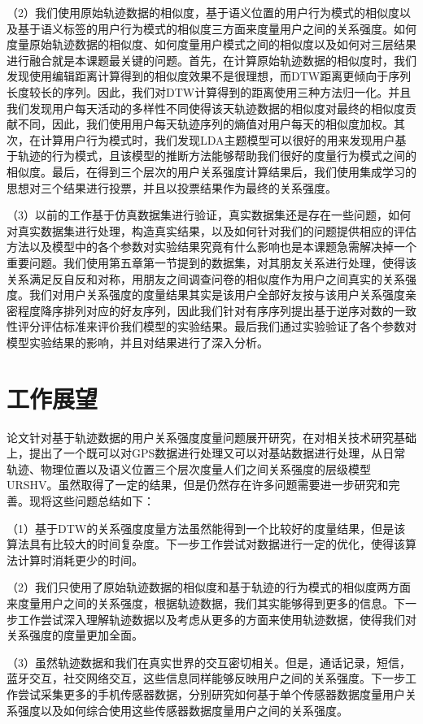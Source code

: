\par （2）我们使用原始轨迹数据的相似度，基于语义位置的用户行为模式的相似度以及基于语义标签的用户行为模式的相似度三方面来度量用户之间的关系强度。如何度量原始轨迹数据的相似度、如何度量用户模式之间的相似度以及如何对三层结果进行融合就是本课题最关键的问题。首先，在计算原始轨迹数据的相似度时，我们发现使用编辑距离计算得到的相似度效果不是很理想，而DTW距离更倾向于序列长度较长的序列。因此，我们对DTW计算得到的距离使用三种方法归一化。并且我们发现用户每天活动的多样性不同使得该天轨迹数据的相似度对最终的相似度贡献不同，因此，我们使用用户每天轨迹序列的熵值对用户每天的相似度加权。其次，在计算用户行为模式时，我们发现LDA主题模型可以很好的用来发现用户基于轨迹的行为模式，且该模型的推断方法能够帮助我们很好的度量行为模式之间的相似度。最后，在得到三个层次的用户关系强度计算结果后，我们使用集成学习的思想对三个结果进行投票，并且以投票结果作为最终的关系强度。
\par （3）以前的工作基于仿真数据集进行验证，真实数据集还是存在一些问题，如何对真实数据集进行处理，构造真实结果，以及如何针对我们的问题提供相应的评估方法以及模型中的各个参数对实验结果究竟有什么影响也是本课题急需解决掉一个重要问题。我们使用第五章第一节提到的数据集，对其朋友关系进行处理，使得该关系满足反自反和对称，用朋友之间调查问卷的相似度作为用户之间真实的关系强度。我们对用户关系强度的度量结果其实是该用户全部好友按与该用户关系强度亲密程度降序排列对应的好友序列，因此我们针对有序序列提出基于逆序对数的一致性评分评估标准来评价我们模型的实验结果。最后我们通过实验验证了各个参数对模型实验结果的影响，并且对结果进行了深入分析。
\section{工作展望}
\label{sec:section6-2}
论文针对基于轨迹数据的用户关系强度度量问题展开研究，在对相关技术研究基础上，提出了一个既可以对GPS数据进行处理又可以对基站数据进行处理，从日常轨迹、物理位置以及语义位置三个层次度量人们之间关系强度的层级模型URSHV。虽然取得了一定的结果，但是仍然存在许多问题需要进一步研究和完善。现将这些问题总结如下：
\par （1）基于DTW的关系强度度量方法虽然能得到一个比较好的度量结果，但是该算法具有比较大的时间复杂度。下一步工作尝试对数据进行一定的优化，使得该算法计算时消耗更少的时间。
\par （2）我们只使用了原始轨迹数据的相似度和基于轨迹的行为模式的相似度两方面来度量用户之间的关系强度，根据轨迹数据，我们其实能够得到更多的信息。下一步工作尝试深入理解轨迹数据以及考虑从更多的方面来使用轨迹数据，使得我们对关系强度的度量更加全面。
\par （3）虽然轨迹数据和我们在真实世界的交互密切相关。但是，通话记录，短信，蓝牙交互，社交网络交互，这些信息同样能够反映用户之间的关系强度。下一步工作尝试采集更多的手机传感器数据，分别研究如何基于单个传感器数据度量用户关系强度以及如何综合使用这些传感器数据度量用户之间的关系强度。
